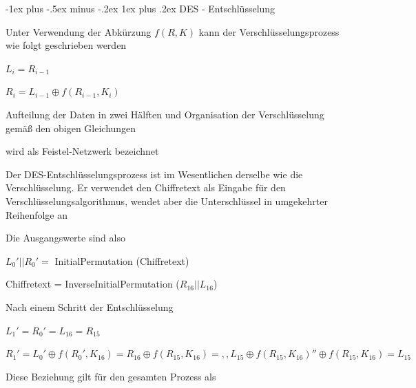 \documentclass[a4paper]{article}
\makeatletter
\renewcommand{\subsubsection}{\@startsection{subsubsection}{3}{0mm}%
 {-1ex plus -.5ex minus -.2ex}%
 {1ex plus .2ex}%
 {\normalfont\small\bfseries}}
\makeatother
\begin{document}
\begin{multicols}{3}
      \subsubsection{DES - Entschlüsselung}
      \begin{itemize*}
            \item Unter Verwendung der Abkürzung $f(R, K)$ kann der Verschlüsselungsprozess wie folgt geschrieben werden
            \begin{itemize*}
                  \item $L_i = R_{i-1}$
                  \item $R_i = L_{i-1}\oplus f(R_{i-1}, K_i)$
                  \item Aufteilung der Daten in zwei Hälften und Organisation der Verschlüsselung gemäß den obigen Gleichungen
                  \item wird als Feistel-Netzwerk bezeichnet
            \end{itemize*}
            \item Der DES-Entschlüsselungsprozess ist im Wesentlichen derselbe wie die Verschlüsselung. Er verwendet den Chiffretext als Eingabe für den Verschlüsselungsalgorithmus, wendet aber die Unterschlüssel in umgekehrter Reihenfolge an
            \item Die Ausgangswerte sind also
            \begin{itemize*}
                  \item $L_0' || R_0' =$ InitialPermutation (Chiffretext)
                  \item Chiffretext = InverseInitialPermutation ($R_{16} || L_{16}$)
            \end{itemize*}
            \item Nach einem Schritt der Entschlüsselung
            \begin{itemize*}
                  \item $L_1' = R_0' = L_{16} = R_{15}$
                  \item $R_1' = L_0' \oplus f(R_0', K_{16})=R_{16}\oplus f(R_{15},K_{16})=,,L_{15}\oplus f(R_{15},K_{16})''\oplus f(R_{15},K_{16}) =L_{15}$
            \end{itemize*}
            \item Diese Beziehung gilt für den gesamten Prozess als
            \begin{itemize*}

\end{itemize*}
\end{itemize*}
\end{multicols}
\end{document}

